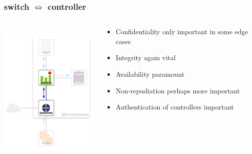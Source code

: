 \documentclass[t,handout]{beamer}
\begin{document}
\begin{frame}
\frametitle{switch $\Longleftrightarrow$  controller}
\begin{columns}[T]
\includegraphics[height=2.75in]{ra-sw-c}
\begin{beamerboxesrounded}[shadow]{}
\begin{itemize}
\item {\color{orange} Confidentiality only important in some edge cases}
\item {\color{red} Integrity again vital}
\item {\color{red} Availability paramount} 
\item {\color{orange} Non-repudiation perhaps more important}
\item {\color{red} Authentication of controllers important}
\end{itemize}
\end{beamerboxesrounded}
\end{columns}
\end{frame}
\end{document}
